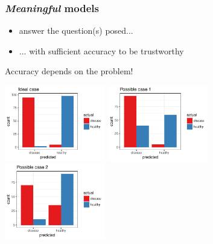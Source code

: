 \documentclass[notes, c, 11pt, xcolor=svgnames, hyperref={colorlinks,citecolor=DeepPink4,linkcolor=DarkRed,urlcolor=DarkBlue}]{beamer}
\begin{document}
\begin{frame}
	\frametitle{\textsl{Meaningful} models}
	
	\begin{itemize}
		\item answer the question(s) posed...
		\item ... with sufficient accuracy to be trustworthy
	\end{itemize}

\vspace{0.6cm}

	\begin{center}
		{\Large \alert{Accuracy depends on the problem!}}
		
		\vspace{1cm}
		
		\includegraphics[width=0.33\textwidth]{images/meaningful_1}
		\includegraphics[width=0.33\textwidth]{images/meaningful_2}
		\includegraphics[width=0.33\textwidth]{images/meaningful_3}
	\end{center}
	
\end{frame}
\end{document}
